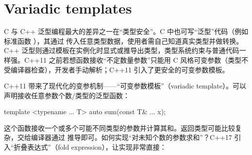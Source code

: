 \section{Variadic templates}
C 与 C++ 泛型编程最大的差异之一在“类型安全”。C 中也可写“泛型”代码（例如标准函数 ），其通过  传入任意类型数据，使用者需自己知道真实类型并做转换。C++ 泛型则通过模板在实例化时显式或推导出类型，类型系统约束与普通代码一样强。C++11 之前若想函数接收“不定数量参数”只能用 C 风格可变参数（类型不受编译器检查），开发者手动解析；C++11 引入了更安全的可变参数模板。

C++11 带来了现代化的变参机制——“可变参数模板”（variadic template）。可以声明接收任意参数个数/类型的泛型函数：

\begin{code}
template <typename ... T> auto sum(const T& ... x);
\end{code}

这个函数接收一个或多个可能不同类型的参数并计算其和。返回类型可能比较复杂，交给编译器通过  推导即可。如何实现“对未知个数的参数求和”？C++17 引入“折叠表达式”（fold expression），让实现非常直接：

